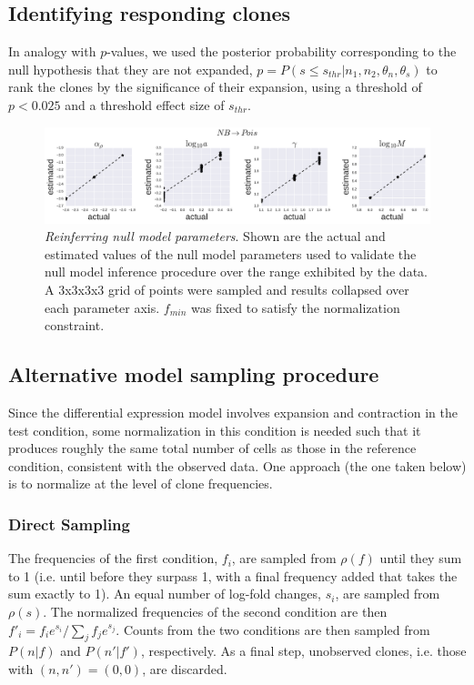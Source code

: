 \documentclass[letterpaper,english,prl,reprint,longbibliography]{revtex4-1} %
\begin{document}
\subsection*{Identifying responding clones}
In analogy with $p$-values, we used the posterior probability corresponding to the null hypothesis that they are not expanded, $p=P(s\leq s_{thr}|n_1,n_2,\theta_n,\theta_s)$ to rank the clones by the significance of their expansion, using a threshold of $p<0.025$ and a threshold effect size of $s_{thr}$. 

\begin{figure}[ht!]
\includegraphics[width=\linewidth]{NB_Pois_nullpara_fits}
\centering{}
\caption{
\emph{Reinferring null model parameters}. Shown are the actual and estimated values of the null model parameters used to validate the null model inference procedure over the range exhibited by the data. A 3x3x3x3 grid of points were sampled and results collapsed over each parameter axis. $f_{min}$ was fixed to satisfy the normalization constraint.
\label{fig:reinfer_null}}
\end{figure}

\subsection*{Alternative model sampling procedure}
Since the differential expression model involves expansion and contraction in the test condition, some normalization in this condition is needed such that it produces roughly the same total number of cells as those in the reference condition, consistent with the observed data. One approach (the one taken below) is to normalize at the level of clone frequencies. 

\subsubsection*{Direct Sampling}
The frequencies of the first condition, $f_i$, are sampled from $\rho(f)$ until they sum to 1 (i.e. until before they surpass 1, with a final frequency added that takes the sum exactly to 1). An equal number of log-fold changes, $s_i$, are sampled from $\rho(s)$. The normalized frequencies of the second condition are then $f'_i=f_ie^{s_i}/\sum_j f_je^{s_j}$.  Counts from the two conditions are then sampled from $P(n|f)$ and $P(n'|f')$, respectively. As a final step, unobserved clones, i.e. those with $(n,n')=(0,0)$, are discarded.
\end{document}

